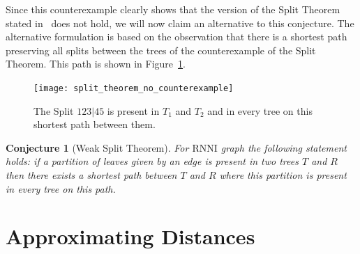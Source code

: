 \documentclass[11pt, a4paper]{article}
\newcommand{\rnni}{\mathrm{RNNI}}
\newtheorem{conjecture}[definition]{Conjecture}
\begin{document}
Since this counterexample clearly shows that the version of the Split Theorem stated in~\cite{Gavryushkin2017} does not hold, we will now claim an alternative to this conjecture.
The alternative formulation is based on the observation that there is a shortest path preserving all splits between the trees of the counterexample of the Split Theorem.
This path is shown in Figure~\ref{split_theorem_no_counterexample}.

\begin{figure}[H]
	\centering
	\texttt{[image: split\_theorem\_no\_counterexample]}
	\caption{The Split $123|45$ is present in $T_1$ and $T_2$ and in every tree on this shortest path between them.}
	\label{split_theorem_no_counterexample}
\end{figure}


\begin{conjecture}[Weak Split Theorem]
	For $\rnni$ graph the following statement holds:
	if a partition of leaves given by an edge is present in two trees $T$ and $R$ then there exists a shortest path between $T$ and $R$ where this partition is present in every tree on this path.
	\label{split_theorem_weak}
\end{conjecture}



%


\section{Approximating Distances}
\end{document}
